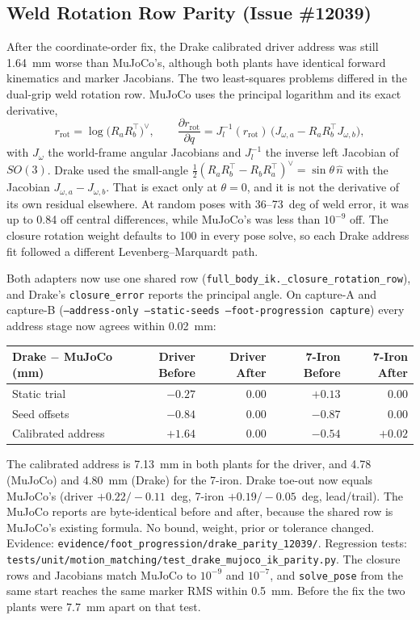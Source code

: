 \documentclass[11pt,a4paper]{article}
\begin{document}
\subsection{Weld Rotation Row Parity (Issue \#12039)}
After the coordinate-order fix, the Drake calibrated driver address was
still 1.64~mm worse than MuJoCo's, although both plants have identical
forward kinematics and marker Jacobians. The two least-squares problems
differed in the dual-grip weld rotation row. MuJoCo uses the principal
logarithm and its exact derivative,
\[
 r_{\mathrm{rot}}=\log\!\bigl(R_aR_b^{\top}\bigr)^{\vee},\qquad
 \frac{\partial r_{\mathrm{rot}}}{\partial q}
 =J_l^{-1}(r_{\mathrm{rot}})\,\bigl(J_{\omega,a}-R_aR_b^{\top}J_{\omega,b}\bigr),
\]
with $J_{\omega}$ the world-frame angular Jacobians and $J_l^{-1}$ the inverse
left Jacobian of $SO(3)$. Drake used the small-angle
$\tfrac12(R_aR_b^{\top}-R_bR_a^{\top})^{\vee}=\sin\theta\,\hat n$ with the
Jacobian $J_{\omega,a}-J_{\omega,b}$. That is exact only at $\theta=0$, and it
is not the derivative of its own residual elsewhere. At random poses with
36--73~deg of weld error, it was up to 0.84 off central differences, while
MuJoCo's was less than $10^{-9}$ off. The closure rotation weight defaults to 100
in every pose solve, so each Drake address fit followed a different
Levenberg--Marquardt path.

Both adapters now use one shared row
(\texttt{full\_body\_ik.\_closure\_rotation\_row}), and Drake's
\texttt{closure\_error} reports the principal angle. On capture-A and
capture-B (\texttt{--address-only --static-seeds --foot-progression capture})
every address stage now agrees within 0.02~mm:

\begin{center}
\small
\begin{tabular}{lrrrr}
\toprule
Drake $-$ MuJoCo (mm) & Driver Before & Driver After & 7-Iron Before & 7-Iron After \\
\midrule
Static trial & $-0.27$ & 0.00 & $+0.13$ & 0.00 \\
Seed offsets & $-0.84$ & 0.00 & $-0.87$ & 0.00 \\
Calibrated address & $+1.64$ & 0.00 & $-0.54$ & $+0.02$ \\
\bottomrule
\end{tabular}
\end{center}

The calibrated address is 7.13~mm in both plants for the driver, and 4.78
(MuJoCo) and 4.80~mm (Drake) for the 7-iron. Drake toe-out now equals MuJoCo's
(driver $+0.22/-0.11$~deg, 7-iron $+0.19/-0.05$~deg, lead/trail). The MuJoCo
reports are byte-identical before and after, because the shared row is
MuJoCo's existing formula. No bound, weight, prior or tolerance changed.
Evidence: \texttt{evidence/foot\_progression/drake\_parity\_12039/}. Regression
tests: \texttt{tests/unit/motion\_matching/test\_drake\_mujoco\_ik\_parity.py}.
The closure rows and Jacobians match MuJoCo to $10^{-9}$ and $10^{-7}$, and
\texttt{solve\_pose} from the same start reaches the same marker RMS within
0.5~mm. Before the fix the two plants were 7.7~mm apart on that test.
\end{document}
